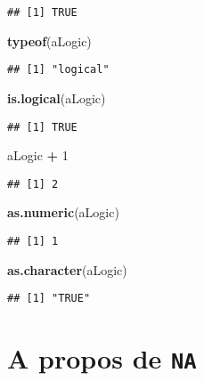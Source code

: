 \documentclass[]{book}
\newenvironment{Shaded}{\begin{snugshade}}{\end{snugshade}}
\newcommand{\KeywordTok}[1]{\textcolor[rgb]{0.13,0.29,0.53}{\textbf{#1}}}
\newcommand{\DecValTok}[1]{\textcolor[rgb]{0.00,0.00,0.81}{#1}}
\newcommand{\StringTok}[1]{\textcolor[rgb]{0.31,0.60,0.02}{#1}}
\newcommand{\OperatorTok}[1]{\textcolor[rgb]{0.81,0.36,0.00}{\textbf{#1}}}
\newcommand{\NormalTok}[1]{#1}
\theoremstyle{definition}
\theoremstyle{definition}
\theoremstyle{definition}
\theoremstyle{remark}
\begin{document}
\begin{verbatim}
## [1] TRUE
\end{verbatim}

\begin{Shaded}
\begin{Highlighting}[]
\KeywordTok{typeof}\NormalTok{(aLogic)}
\end{Highlighting}
\end{Shaded}

\begin{verbatim}
## [1] "logical"
\end{verbatim}

\begin{Shaded}
\begin{Highlighting}[]
\KeywordTok{is.logical}\NormalTok{(aLogic)}
\end{Highlighting}
\end{Shaded}

\begin{verbatim}
## [1] TRUE
\end{verbatim}

\begin{Shaded}
\begin{Highlighting}[]
\NormalTok{aLogic }\OperatorTok{+}\StringTok{ }\DecValTok{1}
\end{Highlighting}
\end{Shaded}

\begin{verbatim}
## [1] 2
\end{verbatim}

\begin{Shaded}
\begin{Highlighting}[]
\KeywordTok{as.numeric}\NormalTok{(aLogic)}
\end{Highlighting}
\end{Shaded}

\begin{verbatim}
## [1] 1
\end{verbatim}

\begin{Shaded}
\begin{Highlighting}[]
\KeywordTok{as.character}\NormalTok{(aLogic)}
\end{Highlighting}
\end{Shaded}

\begin{verbatim}
## [1] "TRUE"
\end{verbatim}

\section{\texorpdfstring{A propos de
\texttt{NA}}{A propos de NA}}\label{a-propos-de-na}
\end{document}
